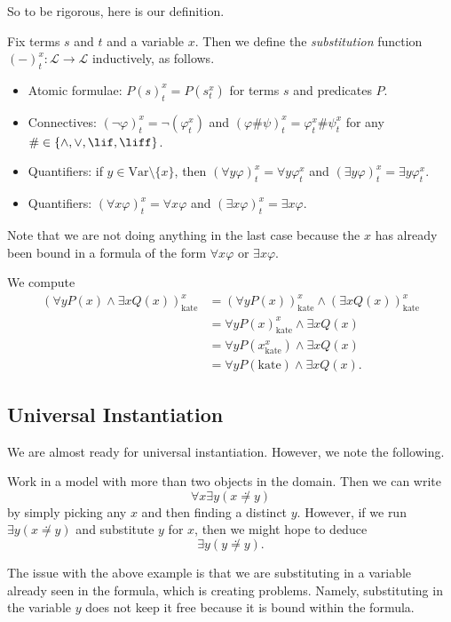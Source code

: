 \documentclass[../notes.tex]{subfiles}
\begin{document}
So to be rigorous, here is our definition.
\begin{definition}
	Fix terms $s$ and $t$ and a variable $x$. Then we define the \textit{substitution} function $(-)^x_t:\mathcal L\to\mathcal L$ inductively, as follows.
	\begin{itemize}
		\item Atomic formulae: $P(s)^x_t=P\left(s^x_t\right)$ for terms $s$ and predicates $P$.
		\item Connectives: $(\lnot\varphi)^x_t=\lnot(\varphi^x_t)$ and $(\varphi\#\psi)^x_t=\varphi^x_t\#\psi^x_t$ for any $\#\in\{\land,\lor,\lif,\liff\}$.
		\item Quantifiers: if $y\in\mathrm{Var}\setminus\{x\}$, then $(\forall y\varphi)_t^x=\forall y\varphi^x_t$ and $(\exists y\varphi)_t^x=\exists y\varphi^x_t$.
		\item Quantifiers: $(\forall x\varphi)_t^x=\forall x\varphi$ and $(\exists x\varphi)_t^x=\exists x\varphi$.
	\end{itemize}
\end{definition}
Note that we are not doing anything in the last case because the $x$ has already been bound in a formula of the form $\forall x\varphi$ or $\exists x\varphi$.
\begin{example}
	We compute
	\begin{align*}
		(\forall yP(x)\land\exists xQ(x))^x_{\mathrm{kate}} &= (\forall yP(x))^x_{\mathrm{kate}}\land(\exists xQ(x))^x_{\mathrm{kate}} \\
		&= \forall yP(x)^x_{\mathrm{kate}}\land\exists xQ(x) \\
		&= \forall yP(x^x_{\mathrm{kate}})\land\exists xQ(x) \\
		&= \forall yP(\mathrm{kate})\land\exists xQ(x).
	\end{align*}
\end{example}

\subsection{Universal Instantiation}
We are almost ready for universal instantiation. However, we note the following.
\begin{example}
	Work in a model with more than two objects in the domain. Then we can write
	\[\forall x\exists y(x\not\doteq y)\]
	by simply picking any $x$ and then finding a distinct $y$. However, if we run $\exists y(x\not\doteq y)$ and substitute $y$ for $x$, then we might hope to deduce
	\[\exists y(y\not\doteq y).\]
\end{example}
The issue with the above example is that we are substituting in a variable already seen in the formula, which is creating problems. Namely, substituting in the variable $y$ does not keep it free because it is bound within the formula.
\end{document}
